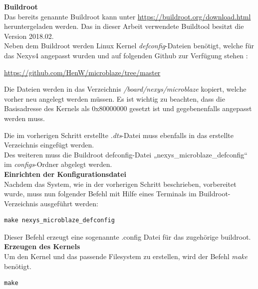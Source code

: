 \textbf{Buildroot}\\

Das bereits genannte Buildroot kann unter \url{https://buildroot.org/download.html} heruntergeladen werden.
Das in dieser Arbeit verwendete Buildtool besitzt die Version 2018.02.\\
Neben dem Buildroot werden Linux Kernel \emph{defconfig}-Dateien benötigt, welche für das Nexys4 angepasst wurden und auf folgenden Github zur Verfügung stehen :

\url{https://github.com/HenW/microblaze/tree/master}

Die Dateien werden in das Verzeichnis \emph{/board/nexys/microblaze} kopiert, welche vorher neu angelegt werden müssen.
 Es ist wichtig zu beachten, dass die Basisadresse des Kernels als 0x80000000 gesetzt ist und gegebenenfalls angepasst werden muss.

Die im vorherigen Schritt erstellte \emph{.dts}-Datei muss ebenfalls in das erstellte Verzeichnis eingefügt werden.\\

Des weiteren muss die Buildroot defconfig-Datei „nexys\_microblaze\_defconfig“ im \emph{configs}-Ordner abgelegt werden.\\

\textbf{Einrichten der Konfigurationsdatei}\\

Nachdem das System, wie in der vorherigen Schritt beschrieben,
vorbereitet wurde, muss nun folgender Befehl mit Hilfe eines Terminals im Buildroot-Verzeichnis ausgeführt werden:\\

\begin{lstlisting}[caption={Generierung der \emph{defconf}-Datei},label={code:mbdefconf}]
  make nexys_microblaze_defconfig
 \end{lstlisting}


Dieser Befehl erzeugt eine sogenannte .config Datei für das zugehörige buildroot.\\

\textbf{Erzeugen des Kernels}\\

Um den Kernel und das passende Filesystem zu erstellen, wird der Befehl \emph{make} benötigt.\\

\begin{lstlisting}[caption={Erstellung des Kernels},label={code:mbkernel}]
  make
   \end{lstlisting}

